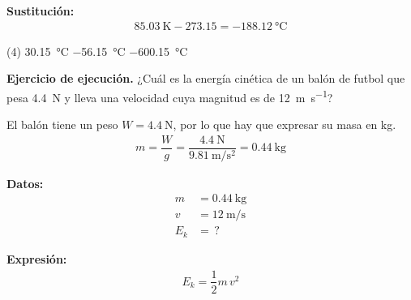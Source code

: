 \documentclass[12pt, letter]{exam}
\begin{document}
\begin{questions}
    \vspace*{0.3cm}
    \textbf{Sustitución:}
    \begin{align*}
        \SI{85.03}{\kelvin} -273.15 = \SI{-188.12}{\degreeCelsius}
    \end{align*}

    \begin{tasks}(4)
        \task \SI{30.15}{\degreeCelsius}
        \task \SI{-56.15}{\degreeCelsius}
        \task {}
        \task \SI{-600.15}{\degreeCelsius}
    \end{tasks}
    \setcounter{question}{31} \question \textbf{Ejercicio de ejecución.} ¿Cuál es la energía cinética de un balón de futbol que pesa \SI{4.4}{\newton} y lleva una velocidad cuya magnitud es de \SI{12}{\meter\per\second}?

    \vspace*{0.3cm}
    El balón tiene un peso $W = \SI{4.4}{\newton}$, por lo que hay que expresar su masa en \unit{\kilo\gram}.
    \begin{align*}
    m = \dfrac{W}{g} = \dfrac{\SI{4.4}{\newton} }{\SI{9.81}{\meter\per\square\second}} = \SI{0.44}{\kilo\gram}
    \end{align*}
    \begin{minipage}[t]{0.4\linewidth}
    \textbf{Datos:}
    \begin{align*}
    m &= \SI{0.44}{\kilo\gram} \\
    v &= \SI{12}{\meter\per\second} \\
    E_{k} &= \, ?
    \end{align*}
    \end{minipage}
    \hspace{1cm}
    \begin{minipage}[t]{0.4\linewidth}
    \textbf{Expresión:}
    \begin{align*}
    E_{k} = \dfrac{1}{2} m \, v^{2}
    \end{align*}
    \end{minipage}


\end{questions}
\end{document}
